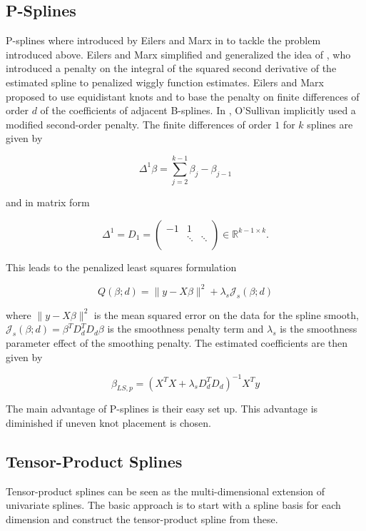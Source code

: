 \documentclass[10pt,a4paper]{article}
\begin{document}
\subsection{P-Splines} \label{SubsectionPspline}

P-splines where introduced by Eilers and Marx in \cite{eilers1996flexible} to tackle the problem introduced above. Eilers and Marx simplified and generalized the idea of \cite{osullivan1986statistical}, who introduced a penalty on the integral of the squared second derivative of the estimated spline to penalized wiggly function estimates. Eilers and Marx proposed to use equidistant knots and to base the penalty on finite differences of order $d$ of the coefficients of adjacent B-splines. In \cite{osullivan1986statistical}, O'Sullivan implicitly used a modified second-order penalty. The finite differences of order $1$ for $k$ splines are given by

$$\Delta^1 \beta = \sum_{j=2}^{k-1} \beta_{j} - \beta_{j-1}$$

and in matrix form

$$\Delta^1 = D_1 = \begin{pmatrix} -1 & 1 \\ & \ddots & \ddots \\   \end{pmatrix} \in \mathbb{R}^{k-1 \times k}.$$

This leads to the penalized least squares formulation

$$Q(\beta; d) = \lVert y - X\beta\rVert^2 + \lambda_s \mathcal J_s(\beta;d)$$

where $\lVert y - X\beta \rVert^2$ is the mean squared error on the data for the spline smooth, $\mathcal J_s(\beta;d) = \beta^T D_d^T D_d \beta$ is the smoothness penalty term and $\lambda_s$ is the smoothness parameter effect of the smoothing penalty. The estimated coefficients are then given by

$$\beta_{LS,p} = (X^TX + \lambda_s D_d^T D_d)^{-1}X^Ty$$

The main advantage of P-splines is their easy set up. This advantage is diminished if uneven knot placement is chosen. 

\subsection{Tensor-Product Splines}

Tensor-product splines can be seen as the multi-dimensional extension of univariate splines. The basic approach is to start with a spline basis for each dimension and construct the tensor-product spline from these. 
\end{document}
